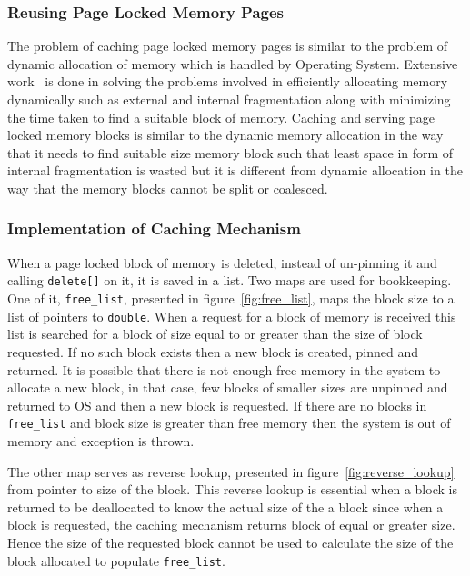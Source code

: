 \subsubsection{Reusing Page Locked Memory Pages}
The problem of caching page locked memory pages is similar to the problem of dynamic
allocation of memory which is handled by Operating System. Extensive work~\cite{Wilson1995}
is done in solving the problems involved in efficiently allocating memory dynamically such
as external and internal fragmentation along with minimizing the time taken to find
a suitable block of memory. Caching and serving page locked memory blocks
is similar to the dynamic memory allocation in the way that it needs to find suitable
size memory block such that least space in form of internal fragmentation is wasted
but it is different from dynamic allocation in the way that the memory blocks cannot
be split or coalesced.

\subsubsection{Implementation of Caching Mechanism}
When a page locked block of memory is deleted, instead of un-pinning it and calling
\texttt{delete[]} on it, it is saved in a list. Two maps are used for bookkeeping.
One of it, \texttt{free\_list}, presented in figure~\ref{fig:free_list},
maps the block size to a list of pointers to \texttt{double}. When a request for
a block of memory is received this list is searched for a block of size equal to or
greater than the size of block requested. If no such block exists then a new block
is created, pinned and returned. It is possible that there is not enough free
memory in the system to allocate a new block, in that case, few blocks of smaller
sizes are unpinned and returned to OS and then a new block is requested. If there
are no blocks in \texttt{free\_list} and block size is greater than free memory
then the system is out of memory and exception is thrown.

The other map serves as reverse lookup, presented in figure~\ref{fig:reverse_lookup}
from pointer to size of the block. This reverse lookup is essential when a block is
returned to be deallocated to know the actual size of the a block since when a block is requested, the caching mechanism
returns block of equal or greater size. Hence the size of the requested block cannot
be used to calculate the size of the block allocated to populate \texttt{free\_list}.

